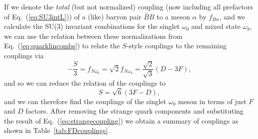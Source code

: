 \documentclass[11pt,a4paper,twoside]{carrollthesis}
\newcommand{\be}{\begin{equation}}
\newcommand{\ee}{\end{equation}}
\newcommand{\w}{\omega}
\begin{document}
%
If we denote the \emph{total} (but not normalized) coupling (now
including all prefactors of Eq.~(\ref{eq:SU3intL})) of a (like) baryon
pair $\bar{B}B$ to a meson $\alpha$ by $f_{B\alpha}$, and we calculate
the SU(3) invariant combinations for the singlet $\w_0$ and mixed
state $\w_8$, we can use the relation between these normalizations
from Eq.~(\ref{eq:quarklincombs}) to relate the $S$-style couplings to
the remaining couplings via
%
\be -\frac{S}{3} = f_{N\w_0} = \sqrt{2}f_{N\w_8} =
\frac{\sqrt{2}}{\sqrt{3}}(D-3F), \ee
%
and so we can reduce the relation of the couplings to
%
\be
\label{eq:strangecoupling}
S = \sqrt{6}(3F-D),
\ee
%
and we can therefore find the couplings of the singlet $\w_0$ meson in
terms of just $F$ and $D$ factors. After removing the strange quark
components and substituting the result of
Eq.~(\ref{eq:strangecoupling}) we obtain a summary of couplings as
shown in Table~\ref{tab:FDcouplings}.\par
%
\end{document}
